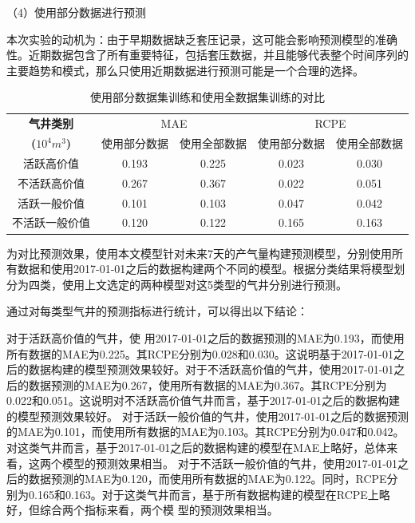 （4）使用部分数据进行预测

本次实验的动机为：由于早期数据缺乏套压记录，这可能会影响预测模型的准确性。近期数据包含了所有重要特征，包括套压数据，并且能够代表整个时间序列的主要趋势和模式，那么只使用近期数据进行预测可能是一个合理的选择。
\begin{table}[h]
    \renewcommand{\arraystretch}{1.5}
    \centering
    \caption{使用部分数据集训练和使用全数据集训练的对比}
    \label{tab:alldatacomparison}
    \begin{tabular}{|c|c|c|c|c|}
    \hline
    \textbf{气井类别} & \multicolumn{2}{c|}{{MAE}} & \multicolumn{2}{c|}{{RCPE}} \\ 
    \cline{2-5} 
    \textbf{(}$10^4 m^3$\textbf{)} & 使用部分数据 & 使用全部数据 & 使用部分数据 & 使用全部数据 \\ 
    \hline
    活跃高价值               & 0.193        & 0.225       & 0.023        & 0.030        \\ 
    \hline
    不活跃高价值               & 0.267        & 0.367        & 0.022        & 0.051        \\ 
    \hline
    活跃一般价值               & 0.101        & 0.103        & 0.047        & 0.042        \\ 
    \hline
    不活跃一般价值               & 0.120        & 0.122        & 0.165        & 0.163        \\ 
    \hline
    \end{tabular}
\end{table}
为对比预测效果，使用本文模型针对未来7天的产气量构建预测模型，分别使用所有数据和使用2017-01-01之后的数据构建两个不同的模型。根据分类结果将模型划分为四类，使用上文选定的两种模型对这5类型的气井分别进行预测。

    
通过对每类型气井的预测指标进行统计，可以得出以下结论：

对于活跃高价值的气井，使
用2017-01-01之后的数据预测的MAE为0.193，而使用所有数据的MAE为0.225。其RCPE分别为0.028和0.030。这说明基于2017-01-01之后的数据构建的模型预测效果较好。对于不活跃高价值的气井，使用2017-01-01之后的数据预测的MAE为0.267，使用所有数据的MAE为0.367。其RCPE分别为0.022和0.051。这说明对不活跃高价值气井而言，基于2017-01-01之后的数据构建的模型预测效果较好。
对于活跃一般价值的气井，使用2017-01-01之后的数据预测的MAE为0.101，而使用所有数据的MAE为0.103。其RCPE分别为0.047和0.042。对这类气井而言，基于2017-01-01之后的数据构建的模型在MAE上略好，总体来看，这两个模型的预测效果相当。
对于不活跃一般价值的气井，使用2017-01-01之后的数据预测的MAE为0.120，而使用所有数据的MAE为0.122。同时，RCPE分别为0.165和0.163。对于这类气井而言，基于所有数据构建的模型在RCPE上略好，但综合两个指标来看，两个模
型的预测效果相当。

